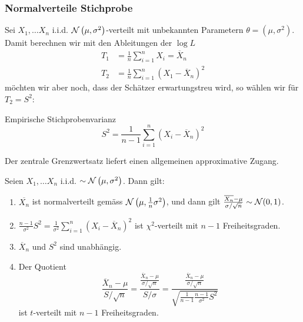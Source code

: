 \subsubsection*{Normalverteile Stichprobe}%
\label{ssub:normalverteile_stichprobe}

Sei $X_1 , \ldots X_n$ i.i.d. $\mathcal{N} \left(\mu, \sigma^2 \right)$-verteilt mit unbekannten
Parametern $\theta = \left(\mu, \sigma^2 \right)$. Damit berechnen wir mit den Ableitungen der $\log L$
\begin{align*}
	T_1 & = \frac{1}{n} \sum_{i=1}^n X_i = \overline{X}_n     \\
	T_2 & = \frac{1}{n} \sum_{i=1}^n (X_1 - \overline{X}_n)^2
\end{align*}
möchten wir aber noch, dass der Schätzer erwartungstreu wird,
so wählen wir für $T_2 = S^2$:
\begin{definition}{Empirische Stichprobenvarianz}
	\begin{equation*}
		S^2 = \frac{1}{n-1} \sum_{i=1}^{n} (X_i - \overline{X}_n)^2
	\end{equation*}
\end{definition}

Der zentrale Grenzwertsatz liefert einen allgemeinen approximative Zugang.

\begin{theorem}{1.6}
	Seien $X_1 , \ldots X_n$ i.i.d. $\sim \mathcal{N} \left( \mu, \sigma^2 \right)$. Dann gilt:
	\begin{enumerate}
		\item $\overline{X_n}$ ist normalverteilt gemäss $\mathcal{N} \left( \mu, \frac{1}{n} \sigma^2 \right)$, und dann gilt
			$\frac{\overline{X_n} - \mu}{\sigma / \sqrt{n}} \sim \mathcal{N} (0,1)$.
		\item $\frac{n-1}{\sigma^2} S^2 = \frac{1}{\sigma^2} \sum_{i=1}^{n} \left( X_i - \overline{X}_n \right)^2$ ist
			$\chi^2$-verteilt mit $n-1$ Freiheitsgraden.
		\item $\overline{X}_n$ und $S^2$ sind unabhängig.
		\item Der Quotient
			\begin{equation*}
				\frac{\overline{X}_n - \mu}{S / \sqrt{n}} = \frac{\frac{\overline{X}_n - \mu}{\sigma / \sqrt{n}}}{S /
				\sigma}  = \frac{\frac{\overline{X}_n - \mu}{\sigma / \sqrt{n}}}{\sqrt{\frac{1}{n-1} \frac{n-1}{\sigma^2}
			S^2}}
			\end{equation*}
			ist $t$-verteilt mit $n-1$ Freiheitsgraden.
	\end{enumerate}
\end{theorem}
